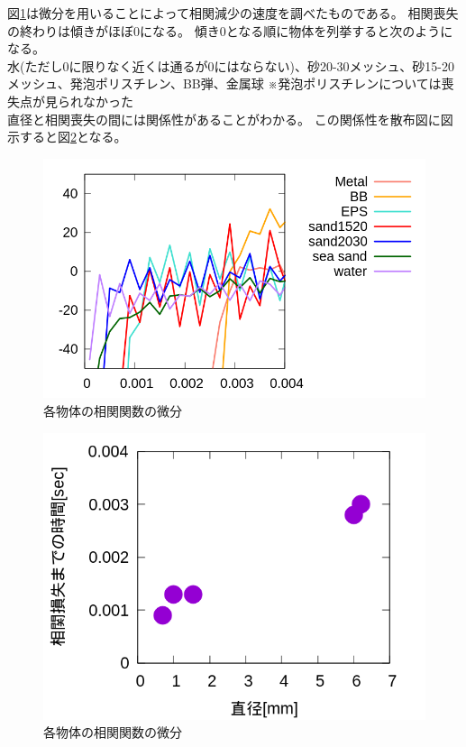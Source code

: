 \documentclass[a4paper,10pt,twocolumn,dvipdfmx]{jsarticle}
\begin{document}
図\ref{fig:diff}は微分を用いることによって相関減少の速度を調べたものである。
相関喪失の終わりは傾きがほぼ0になる。
傾き0となる順に物体を列挙すると次のようになる。\\
水(ただし0に限りなく近くは通るが0にはならない)、砂20-30メッシュ、砂15-20メッシュ、発泡ポリスチレン、BB弾、金属球 ※発泡ポリスチレンについては喪失点が見られなかった\\
直径と相関喪失の間には関係性があることがわかる。
この関係性を散布図に図示すると図\ref{fig:zero}となる。

\begin{figure}[H]
	\includegraphics[scale=0.4]{diff.png}
	\caption{各物体の相関関数の微分}
	\label{fig:diff}
\end{figure}
\begin{figure}[H]
	\includegraphics[scale=0.4]{zeropoint.png}
	\caption{各物体の相関関数の微分}
	\label{fig:zero}
\end{figure}
\end{document}
